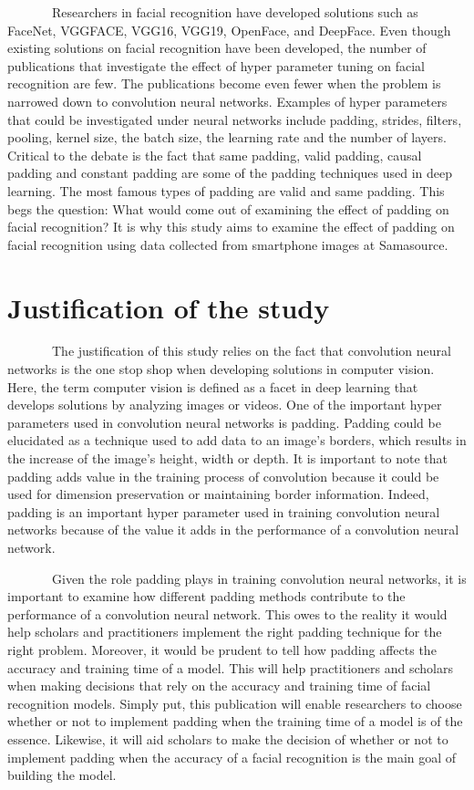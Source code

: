 \documentclass[
  12pt,
]{report}
\begin{document}
~~~~~~~Researchers in facial recognition have developed solutions such
as FaceNet, VGGFACE, VGG16, VGG19, OpenFace, and DeepFace. Even though
existing solutions on facial recognition have been developed, the number
of publications that investigate the effect of hyper parameter tuning on
facial recognition are few. The publications become even fewer when the
problem is narrowed down to convolution neural networks. Examples of
hyper parameters that could be investigated under neural networks
include padding, strides, filters, pooling, kernel size, the batch size,
the learning rate and the number of layers. Critical to the debate is
the fact that same padding, valid padding, causal padding and constant
padding are some of the padding techniques used in deep learning. The
most famous types of padding are valid and same padding. This begs the
question: What would come out of examining the effect of padding on
facial recognition? It is why this study aims to examine the effect of
padding on facial recognition using data collected from smartphone
images at Samasource.

\section{Justification of the study}\label{justification-of-the-study}

~~~~~~~The justification of this study relies on the fact that
convolution neural networks is the one stop shop when developing
solutions in computer vision. Here, the term computer vision is defined
as a facet in deep learning that develops solutions by analyzing images
or videos. One of the important hyper parameters used in convolution
neural networks is padding. Padding could be elucidated as a technique
used to add data to an image's borders, which results in the increase of
the image's height, width or depth. It is important to note that padding
adds value in the training process of convolution because it could be
used for dimension preservation or maintaining border information.
Indeed, padding is an important hyper parameter used in training
convolution neural networks because of the value it adds in the
performance of a convolution neural network.

~~~~~~~Given the role padding plays in training convolution neural
networks, it is important to examine how different padding methods
contribute to the performance of a convolution neural network. This owes
to the reality it would help scholars and practitioners implement the
right padding technique for the right problem. Moreover, it would be
prudent to tell how padding affects the accuracy and training time of a
model. This will help practitioners and scholars when making decisions
that rely on the accuracy and training time of facial recognition
models. Simply put, this publication will enable researchers to choose
whether or not to implement padding when the training time of a model is
of the essence. Likewise, it will aid scholars to make the decision of
whether or not to implement padding when the accuracy of a facial
recognition is the main goal of building the model.
\end{document}
